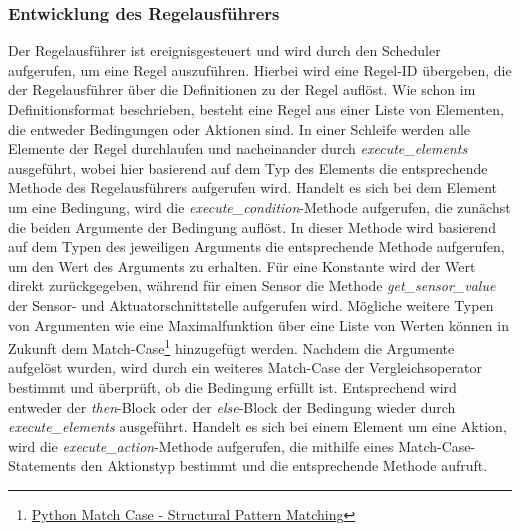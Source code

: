 \subsubsection{Entwicklung des Regelausführers}
Der Regelausführer ist ereignisgesteuert und wird durch den Scheduler aufgerufen, um eine Regel auszuführen.
Hierbei wird eine Regel-ID übergeben, die der Regelausführer über die Definitionen zu der Regel auflöst.
Wie schon im Definitionsformat beschrieben, besteht eine Regel aus einer Liste von Elementen, die entweder Bedingungen oder Aktionen sind.
In einer Schleife werden alle Elemente der Regel durchlaufen und nacheinander durch \emph{execute\_elements} ausgeführt, wobei hier basierend auf dem Typ des Elements die entsprechende Methode des Regelausführers aufgerufen wird.
Handelt es sich bei dem Element um eine Bedingung, wird die \emph{execute\_condition}-Methode aufgerufen, die zunächst die beiden Argumente der Bedingung auflöst.
In dieser Methode wird basierend auf dem Typen des jeweiligen Arguments die entsprechende Methode aufgerufen, um den Wert des Arguments zu erhalten.
Für eine Konstante wird der Wert direkt zurückgegeben, während für einen Sensor die Methode \emph{get\_sensor\_value} der Sensor- und Aktuatorschnittstelle aufgerufen wird.
Mögliche weitere Typen von Argumenten wie eine Maximalfunktion über eine Liste von Werten können in Zukunft dem Match-Case\footnote{\href{https://peps.python.org/pep-0634/}{Python Match Case - Structural Pattern Matching}} hinzugefügt werden.
Nachdem die Argumente aufgelöst wurden, wird durch ein weiteres Match-Case der Vergleichsoperator bestimmt und überprüft, ob die Bedingung erfüllt ist.
Entsprechend wird entweder der \emph{then}-Block oder der \emph{else}-Block der Bedingung wieder durch \emph{execute\_elements} ausgeführt.
Handelt es sich bei einem Element um eine Aktion, wird die \emph{execute\_action}-Methode aufgerufen, die mithilfe eines Match-Case-Statements den Aktionstyp bestimmt und die entsprechende Methode aufruft.

